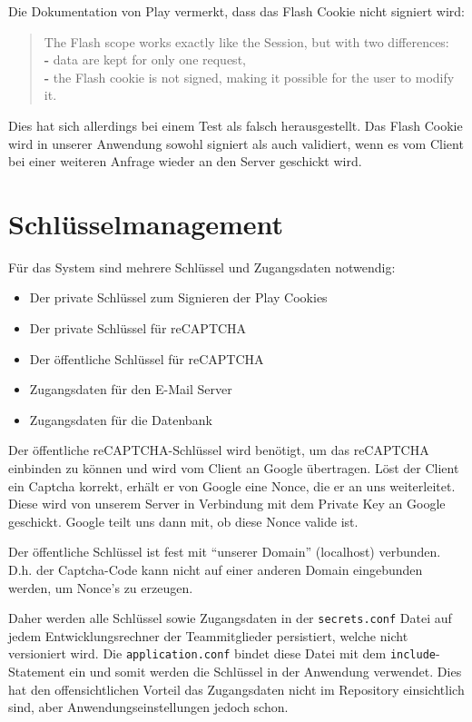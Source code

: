 \documentclass[12pt,DIV14,BCOR10mm,a4paper,parskip=half-,headsepline,headinclude,english,ngerman,bibliography=totocnumbered]{scrreprt}
\begin{document}
Die Dokumentation von Play vermerkt, dass das Flash Cookie nicht signiert wird:
\blockquote{
The Flash scope works exactly like the Session, but with two differences: \\
\textbf{-} data are kept for only one request, \\
\textbf{-} the Flash cookie is not signed, making it possible for the user to modify it. \autocite{JavaPlayFlashDocu}
}
Dies hat sich allerdings bei einem Test als falsch herausgestellt. Das Flash Cookie wird in unserer Anwendung sowohl signiert als auch validiert, wenn es vom Client bei einer weiteren Anfrage wieder an den Server geschickt wird.

\section{Schlüsselmanagement}
Für das System sind mehrere Schlüssel und Zugangsdaten notwendig:

\begin{itemize}
	\item Der private Schlüssel zum Signieren der Play Cookies
	\item Der private Schlüssel für reCAPTCHA
	\item Der öffentliche Schlüssel für reCAPTCHA
	\item Zugangsdaten für den E-Mail Server
	\item Zugangsdaten für die Datenbank
\end{itemize}

Der öffentliche reCAPTCHA-Schlüssel wird benötigt, um das reCAPTCHA einbinden zu können und wird vom Client an Google übertragen. Löst der Client ein Captcha korrekt, erhält er von Google eine Nonce, die er an uns weiterleitet. Diese wird von unserem Server in Verbindung mit dem Private Key an Google geschickt. Google teilt uns dann mit, ob diese Nonce valide ist.

Der öffentliche Schlüssel ist fest mit \enquote{unserer Domain} (localhost) verbunden. D.h. der Captcha-Code kann nicht auf einer anderen Domain eingebunden werden, um Nonce's zu erzeugen.

Daher werden alle Schlüssel sowie Zugangsdaten in der \texttt{secrets.conf} Datei auf jedem Entwicklungsrechner der Teammitglieder persistiert, welche nicht versioniert wird. Die \texttt{application.conf} bindet diese Datei mit dem \texttt{include}-Statement ein und somit werden die Schlüssel in der Anwendung verwendet. Dies hat den offensichtlichen Vorteil das Zugangsdaten nicht im Repository einsichtlich sind, aber Anwendungseinstellungen jedoch schon.
\end{document}
